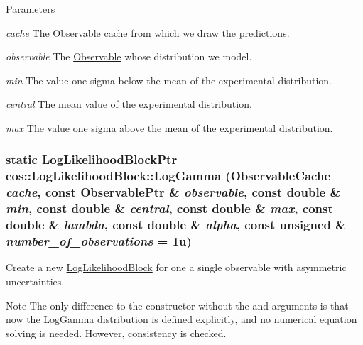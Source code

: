 \begin{DoxyParams}{Parameters}
\item[{\em cache}]The \hyperlink{classeos_1_1Observable}{Observable} cache from which we draw the predictions. \item[{\em observable}]The \hyperlink{classeos_1_1Observable}{Observable} whose distribution we model. \item[{\em min}]The value one sigma below the mean of the experimental distribution. \item[{\em central}]The mean value of the experimental distribution. \item[{\em max}]The value one sigma above the mean of the experimental distribution. \end{DoxyParams}
\hypertarget{classeos_1_1LogLikelihoodBlock_ac4c4437c0d679ae36db0fe6906532f2d}{
\subsubsection[{LogGamma}]{\setlength{\rightskip}{0pt plus 5cm}static {\bf LogLikelihoodBlockPtr} eos::LogLikelihoodBlock::LogGamma ({\bf ObservableCache} {\em cache}, \/  const {\bf ObservablePtr} \& {\em observable}, \/  const double \& {\em min}, \/  const double \& {\em central}, \/  const double \& {\em max}, \/  const double \& {\em lambda}, \/  const double \& {\em alpha}, \/  const unsigned \& {\em number\_\-of\_\-observations} = {\ttfamily 1u})}}
\label{classeos_1_1LogLikelihoodBlock_ac4c4437c0d679ae36db0fe6906532f2d}
Create a new \hyperlink{classeos_1_1LogLikelihoodBlock}{LogLikelihoodBlock} for one a single observable with asymmetric uncertainties.

\begin{DoxyNote}{Note}
The only difference to the constructor without the  and  arguments is that now the LogGamma distribution is defined explicitly, and no numerical equation solving is needed. However, consistency is checked.
\end{DoxyNote}

